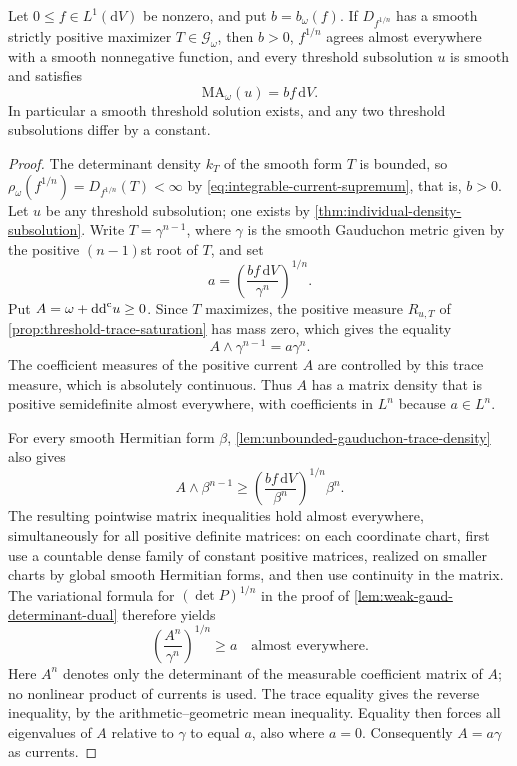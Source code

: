 \begin{corollary}\label{cor:smooth-dual-exact-equation}\label{cor:smooth-dual-threshold-rigidity}
Let $0\leq f\in L^1(\mathrm{d}V)$ be nonzero, and put $b=b_\omega(f)$. If $D_{f^{1/n}}$ has a smooth strictly positive maximizer $T\in\mathscr G_\omega$, then $b>0$, $f^{1/n}$ agrees almost everywhere with a smooth nonnegative function, and every threshold subsolution $u$ is smooth and satisfies
\[
 \mathrm{MA}_\omega(u)=bf\,\mathrm{d}V.
\]
In particular a smooth threshold solution exists, and any two threshold subsolutions differ by a constant.
\end{corollary}
\begin{proof}
The determinant density $k_T$ of the smooth form $T$ is bounded, so $\rho_\omega(f^{1/n})=D_{f^{1/n}}(T)<\infty$ by \eqref{eq:integrable-current-supremum}, that is, $b>0$. Let $u$ be any threshold subsolution; one exists by \cref{thm:individual-density-subsolution}. Write $T=\gamma^{n-1}$, where $\gamma$ is the smooth Gauduchon metric given by the positive $(n-1)$st root of $T$, and set
\[
 a=\left(\frac{bf\,\mathrm{d}V}{\gamma^n}\right)^{1/n}.
\]
Put $A=\omega+\mathrm{dd}^{\mathrm{c}} u\geq0$. Since $T$ maximizes, the positive measure $R_{u,T}$ of \cref{prop:threshold-trace-saturation} has mass zero, which gives the equality
\[
 A\wedge\gamma^{n-1}=a\gamma^n.
\]
The coefficient measures of the positive current $A$ are controlled by this trace measure, which is absolutely continuous. Thus $A$ has a matrix density that is positive semidefinite almost everywhere, with coefficients in $L^n$ because $a\in L^n$.

For every smooth Hermitian form $\beta$, \cref{lem:unbounded-gauduchon-trace-density} also gives
\[
 A\wedge\beta^{n-1}
 \geq\left(\frac{bf\,\mathrm{d}V}{\beta^n}\right)^{1/n}\beta^n.
\]
The resulting pointwise matrix inequalities hold almost everywhere, simultaneously for all positive definite matrices: on each coordinate chart, first use a countable dense family of constant positive matrices, realized on smaller charts by global smooth Hermitian forms, and then use continuity in the matrix. The variational formula for $(\det P)^{1/n}$ in the proof of \cref{lem:weak-gaud-determinant-dual} therefore yields
\[
 \left(\frac{A^n}{\gamma^n}\right)^{1/n}\geq a
 \quad\text{almost everywhere}.
\]
Here $A^n$ denotes only the determinant of the measurable coefficient matrix of $A$; no nonlinear product of currents is used. The trace equality gives the reverse inequality, by the arithmetic--geometric mean inequality. Equality then forces all eigenvalues of $A$ relative to $\gamma$ to equal $a$, also where $a=0$. Consequently $A=a\gamma$ as currents.


\end{proof}
